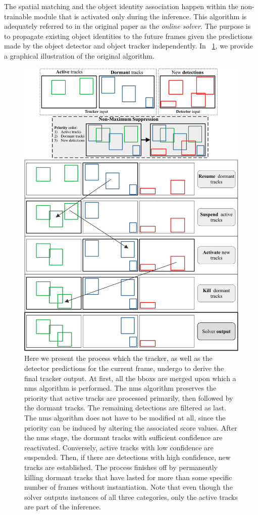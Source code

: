 The spatial matching and the object identity association happen within the non-trainable module that is activated only during the inference. This algorithm is adequately referred to in the original paper as the \emph{online solver}. The purpose is to propagate existing object identities to the future frames given the predictions made by the object detector and object tracker independently. In \figtext{}~\ref{fig:SiamMOTOnlineSolver}, we provide a graphical illustration of the original algorithm.

\begin{figure}[!t]
    \centering
    \includegraphics[width=0.85\linewidth]{figures/siamese_tracking/siammot_online_solver.pdf}
    \caption[\gls{siammot} online solver]{Here we present the process which the tracker, as well as the detector predictions for the current frame, undergo to derive the final tracker output. At first, all the \glspl{bbox} are merged upon which a \gls{nms} algorithm is performed. The \gls{nms} algorithm preserves the priority that active tracks are processed primarily, then followed by the dormant tracks. The remaining detections are filtered as last. The \gls{nms} algorithm does not have to be modified at all, since the priority can be induced by altering the associated score values. After the \gls{nms} stage, the dormant tracks with sufficient confidence are reactivated. Conversely, active tracks with low confidence are suspended. Then, if there are detections with high confidence, new tracks are established. The process finishes off by permanently killing dormant tracks that have lasted for more than some specific number of frames without instantiation. Note that even though the solver outputs instances of all three categories, only the active tracks are part of the inference.}
    \label{fig:SiamMOTOnlineSolver}
\end{figure}
